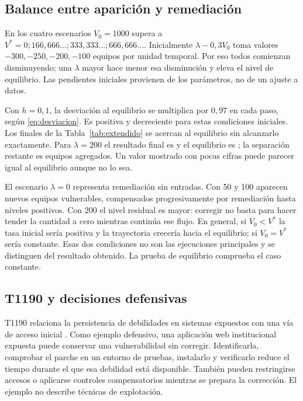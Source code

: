 \documentclass[11pt,a4paper]{article}
\begin{document}
\subsection{Balance entre aparición y remediación}
En los cuatro escenarios $V_0=1000$ supera a $V^*=0;166,666\ldots;333,333\ldots;666,666\ldots$. Inicialmente $\lambda-0,3V_0$ toma valores $-300,-250,-200,-100$ equipos por unidad temporal. Por eso todos comienzan disminuyendo; una $\lambda$ mayor hace menor esa disminución y eleva el nivel de equilibrio. Las pendientes iniciales provienen de los parámetros, no de un ajuste a datos.

Con $h=0,1$, la desviación al equilibrio se multiplica por $0,97$ en cada paso, según \ref{eq:desviacion}. Es positiva y decreciente para estas condiciones iniciales. Los finales de la Tabla~\ref{tab:extendido} se acercan al equilibrio sin alcanzarlo exactamente. Para $\lambda=200$ el resultado final es \ExtendidoFinal{} y el equilibrio es \ExtendidoEquilibrio{}; la separación restante es \ExtendidoDistancia{} equipos agregados. Un valor mostrado con pocas cifras puede parecer igual al equilibrio aunque no lo sea.

El escenario $\lambda=0$ representa remediación sin entradas. Con 50 y 100 aparecen nuevos equipos vulnerables, compensados progresivamente por remediación hasta niveles positivos. Con 200 el nivel residual es mayor: corregir no basta para hacer tender la cantidad a cero mientras continúa ese flujo. En general, si $V_0<V^*$ la tasa inicial sería positiva y la trayectoria crecería hacia el equilibrio; si $V_0=V^*$ sería constante. Esas dos condiciones no son las ejecuciones principales y se distinguen del resultado obtenido. La prueba de equilibrio comprueba el caso constante.

\subsection{T1190 y decisiones defensivas}
T1190 relaciona la persistencia de debilidades en sistemas expuestos con una vía de acceso inicial \parencite{mitre}. Como ejemplo defensivo, una aplicación web institucional expuesta puede conservar una vulnerabilidad sin corregir. Identificarla, comprobar el parche en un entorno de pruebas, instalarlo y verificarlo reduce el tiempo durante el que esa debilidad está disponible. También pueden restringirse accesos o aplicarse controles compensatorios mientras se prepara la corrección. El ejemplo no describe técnicas de explotación.
\end{document}
